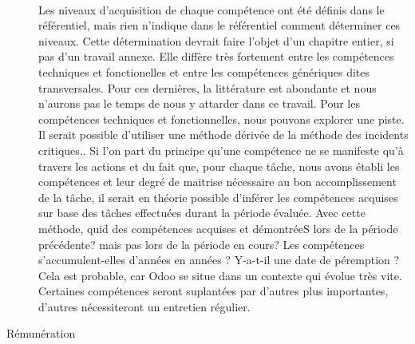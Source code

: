 \begin{description}
\paragraph{}Les niveaux d'acquisition de chaque compétence ont été définis dans le référentiel, mais rien n'indique dans le référentiel comment déterminer ces niveaux. Cette détermination devrait faire l'objet d'un chapitre entier, si pas d'un travail annexe. Elle diffère très fortement entre les compétences techniques et fonctionelles et entre les compétences génériques dites transversales. Pour ces dernières, la littérature est abondante et nous n'aurons pas le temps de nous y attarder dans ce travail. Pour les compétences techniques et fonctionnelles, nous pouvons explorer une piste. Il serait possible d'utiliser une méthode dérivée de la méthode des incidents critiques.\citep[pp.272]{gestionressourceshumaine2002}. Si l'on part du principe qu'une compétence ne se manifeste qu'à travers les actions\citep[pp.171]{gestionressourceshumaine2007} et du fait que, pour chaque tâche, nous avons établi les compétences et leur degré de maitrise nécessaire au bon accomplissement de la tâche, il serait en théorie possible d'inférer les compétences acquises sur base des tâches effectuées durant la période évaluée. Avec cette méthode, quid des compétences acquises et démontréeS lors de la période précédente? mais pas lors de la période en cours? Les compétences s'accumulent-elles d'années en années ? Y-a-t-il une date de péremption ? Cela est probable, car Odoo se situe dans un contexte qui évolue très vite. Certaines compétences seront suplantées par d'autres plus importantes, d'autres nécessiteront un entretien régulier. 
    \item[Rémunération]

\end{description}
